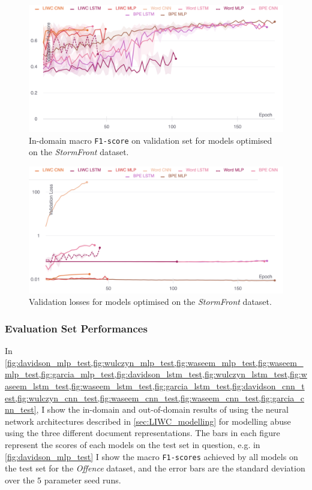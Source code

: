 \begin{figure}
    \centering
    \includegraphics[width=\textwidth]{garcia_dev_f1.pdf}
    \caption{In-domain macro \texttt{F1-score} on validation set for models optimised on the \textit{StormFront} dataset.}
    \label{fig:garcia_dev_f1}
\end{figure}
\begin{figure}
    \centering
    \includegraphics[width=\textwidth]{garcia_dev_loss_stderr_logscale.pdf}
    \caption{Validation losses for models optimised on the \textit{StormFront} dataset.}
    \label{fig:garcia_dev_loss}
\end{figure}

\subsubsection{Evaluation Set Performances}
In \cref{fig:davidson_mlp_test,fig:wulczyn_mlp_test,fig:waseem_mlp_test,fig:waseem_mlp_test,fig:garcia_mlp_test,fig:davidson_lstm_test,fig:wulczyn_lstm_test,fig:waseem_lstm_test,fig:waseem_lstm_test,fig:garcia_lstm_test,fig:davidson_cnn_test,fig:wulczyn_cnn_test,fig:waseem_cnn_test,fig:waseem_cnn_test,fig:garcia_cnn_test}, I show the in-domain and out-of-domain results of using the neural network architectures described in \cref{sec:LIWC_modelling} for modelling abuse using the three different document representations.
The bars in each figure represent the scores of each models on the test set in question, e.g. in \cref{fig:davidson_mlp_test} I show the macro \texttt{F1-scores} achieved by all models on the test set for the \textit{Offence} dataset, and the error bars are the standard deviation over the $5$ parameter seed runs.


